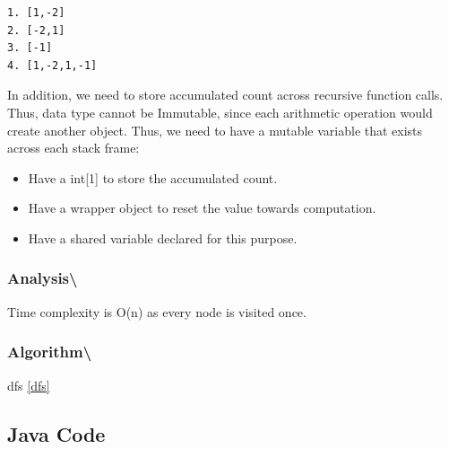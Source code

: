 \documentclass[]{book}
\providecommand{\tightlist}{%
  \setlength{\itemsep}{0pt}\setlength{\parskip}{0pt}}
\begin{document}
\begin{verbatim}
1. [1,-2]
2. [-2,1]
3. [-1]
4. [1,-2,1,-1]
\end{verbatim}

In addition, we need to store accumulated count across recursive function calls. Thus, data type cannot be Immutable,
since each arithmetic operation would create another object. Thus, we need to have a mutable variable that exists
across each stack frame:

\begin{itemize}
\tightlist
\item
  Have a int{[}1{]} to store the accumulated count.
\item
  Have a wrapper object to reset the value towards computation.
\item
  Have a shared variable declared for this purpose.
\end{itemize}

\hypertarget{analysis-72}{%
\subsubsection{Analysis\textbackslash{}}\label{analysis-72}}

Time complexity is O(n) as every node is visited once.

\hypertarget{algorithm-74}{%
\subsubsection{Algorithm\textbackslash{}}\label{algorithm-74}}

dfs \ref{dfs}

\hypertarget{java-code-47}{%
\subsection{Java Code}\label{java-code-47}}
\end{document}
